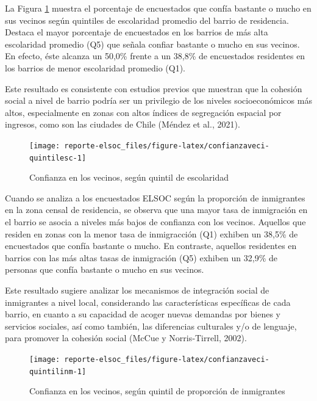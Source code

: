 \documentclass[
  12pt,
]{book}
\begin{document}
La Figura \ref{fig:confianzaveci-quintilesc} muestra el porcentaje de encuestados que confía bastante o mucho en sus vecinos según quintiles de escolaridad promedio del barrio de residencia. Destaca el mayor porcentaje de encuestados en los barrios de más alta escolaridad promedio (Q5) que señala confiar bastante o mucho en sus vecinos. En efecto, éste alcanza un 50,0\% frente a un 38,8\% de encuestados residentes en los barrios de menor escolaridad promedio (Q1).

Este resultado es consistente con estudios previos que muestran que la cohesión social a nivel de barrio podría ser un privilegio de los niveles socioeconómicos más altos, especialmente en zonas con altos índices de segregación espacial por ingresos, como son las ciudades de Chile (Méndez et al., 2021).

\begin{figure}

{\centering \texttt{[image: reporte-elsoc\_files/figure-latex/confianzaveci-quintilesc-1]} 

}

\caption{Confianza en los vecinos, según quintil de  escolaridad}\label{fig:confianzaveci-quintilesc}
\end{figure}

Cuando se analiza a los encuestados ELSOC según la proporción de inmigrantes en la zona censal de residencia, se observa que una mayor tasa de inmigración en el barrio se asocia a niveles más bajos de confianza con los vecinos. Aquellos que residen en zonas con la menor tasa de inmigracción (Q1) exhiben un 38,5\% de encuestados que confía bastante o mucho. En contraste, aquellos residentes en barrios con las más altas tasas de inmigración (Q5) exhiben un 32,9\% de personas que confía bastante o mucho en sus vecinos.

Este resultado sugiere analizar los mecanismos de integración social de inmigrantes a nivel local, considerando las características específicas de cada barrio, en cuanto a su capacidad de acoger nuevas demandas por bienes y servicios sociales, así como también, las diferencias culturales y/o de lenguaje, para promover la cohesión social (McCue y Norris‐Tirrell, 2002).

\begin{figure}

{\centering \texttt{[image: reporte-elsoc\_files/figure-latex/confianzaveci-quintilinm-1]} 

}

\caption{Confianza en los vecinos, según quintil de proporción de inmigrantes}\label{fig:confianzaveci-quintilinm}
\end{figure}
\end{document}
